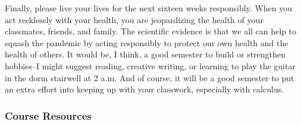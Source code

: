 \documentclass[12pt]{article}
\newcounter{ex}\setcounter{ex}{0}
\begin{document}
Finally, please live your lives for the next sixteen weeks responsibly.  When you act recklessly with your health, you are jeopardizing the health of your classmates, friends, and family. The scientific evidence is that we all can help to squash the pandemic by acting responsibly to protect our own health and the health of others.  It would be, I think, a good semester to build or strengthen hobbies--I might suggest reading, creative writing, or learning to play the guitar in the dorm stairwell at 2 a.m.  And of course, it will be a good semester to put an extra effort into keeping up with your classwork, especially with calculus.



\subsubsection*{Course Resources}
\end{document}
